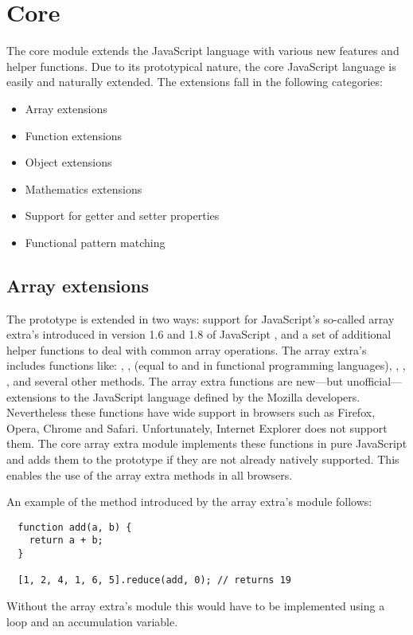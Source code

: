 \section{Core}
The core module extends the JavaScript language with various new features and helper functions. Due to its prototypical nature, the core JavaScript language is easily and naturally extended. The extensions fall in the following categories:

\begin{itemize}
\item Array extensions
\item Function extensions
\item Object extensions
\item Mathematics extensions
\item Support for getter and setter properties
\item Functional pattern matching
\end{itemize}

\subsection{Array extensions}
The  prototype is extended in two ways: support for JavaScript's so-called array extra's introduced in version 1.6 and 1.8 of JavaScript \cite{mozilla07, mozilla08}, and a set of additional helper functions to deal with common array operations. The array extra's includes functions like: , ,  (equal to  and  in functional programming languages), , , , and several other methods. The array extra functions are new---but unofficial---extensions to the JavaScript language defined by the Mozilla developers. Nevertheless these functions have wide support in browsers such as Firefox, Opera, Chrome and Safari. Unfortunately, Internet Explorer does not support them. The core array extra module implements these functions in pure JavaScript and adds them to the  prototype if they are not already natively supported. This enables the use of the array extra methods in all browsers.

An example of the  method introduced by the array extra's module follows:
\begin{verbatim}
  function add(a, b) {
    return a + b;
  }

  [1, 2, 4, 1, 6, 5].reduce(add, 0); // returns 19
\end{verbatim}
Without the array extra's module this would have to be implemented using a  loop and an accumulation variable.

